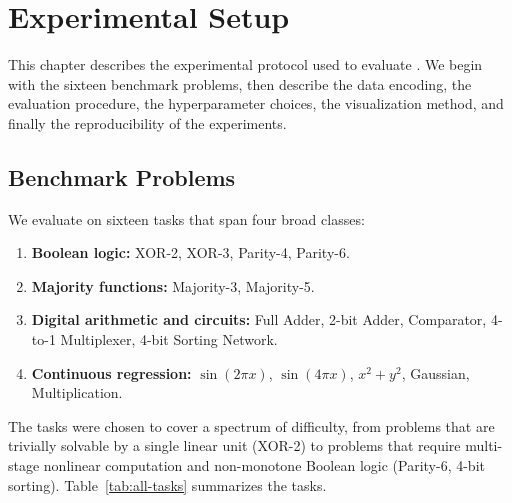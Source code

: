 
\chapter{Experimental Setup}
\label{ch:experiments}

This chapter describes the experimental protocol used to evaluate
\modnet{}. We begin with the sixteen benchmark problems, then describe
the data encoding, the evaluation procedure, the hyperparameter choices,
the visualization method, and finally the reproducibility of the
experiments.

\section{Benchmark Problems}
\label{sec:exp-tasks}

We evaluate \modnet{} on sixteen tasks that span four broad classes:

\begin{enumerate}
  \item \textbf{Boolean logic:} XOR-2, XOR-3, Parity-4, Parity-6.
  \item \textbf{Majority functions:} Majority-3, Majority-5.
  \item \textbf{Digital arithmetic and circuits:} Full Adder, 2-bit
    Adder, Comparator, 4-to-1 Multiplexer, 4-bit Sorting Network.
  \item \textbf{Continuous regression:} $\sin(2\pi x)$, $\sin(4\pi x)$,
    $x^2 + y^2$, Gaussian, Multiplication.
\end{enumerate}

The tasks were chosen to cover a spectrum of difficulty, from problems
that are trivially solvable by a single linear unit (XOR-2) to problems
that require multi-stage nonlinear computation and non-monotone Boolean
logic (Parity-6, 4-bit sorting). Table~\ref{tab:all-tasks} summarizes
the tasks.

